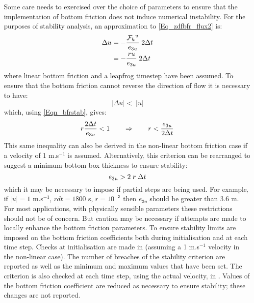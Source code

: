 \documentclass[NEMO_book]{subfiles}
\begin{document}
Some care needs to exercised over the choice of parameters to ensure that the
implementation of bottom friction does not induce numerical instability. For 
the purposes of stability analysis, an approximation to \eqref{Eq_zdfbfr_flux2}
is:
\begin{equation} \label{Eqn_bfrstab}
\begin{split}
 \Delta u &= -\frac{{{\cal F}_h}^u}{e_{3u}}\;2 \Delta t    \\
               &= -\frac{ru}{e_{3u}}\;2\Delta t\\
\end{split}
\end{equation}
\noindent where linear bottom friction and a leapfrog timestep have been assumed. 
To ensure that the bottom friction cannot reverse the direction of flow it is necessary to have:
\begin{equation}
 |\Delta u| < \;|u| 
\end{equation}
\noindent which, using \eqref{Eqn_bfrstab}, gives:
\begin{equation}
r\frac{2\Delta t}{e_{3u}} < 1 \qquad  \Rightarrow \qquad r < \frac{e_{3u}}{2\Delta t}\\
\end{equation}
This same inequality can also be derived in the non-linear bottom friction case 
if a velocity of 1 m.s$^{-1}$ is assumed. Alternatively, this criterion can be 
rearranged to suggest a minimum bottom box thickness to ensure stability:
\begin{equation}
e_{3u} > 2\;r\;\Delta t
\end{equation}
\noindent which it may be necessary to impose if partial steps are being used. 
For example, if $|u| = 1$ m.s$^{-1}$, $rdt = 1800$ s, $r = 10^{-3}$ then
$e_{3u}$ should be greater than 3.6 m. For most applications, with physically
sensible parameters these restrictions should not be of concern. But 
caution may be necessary if attempts are made to locally enhance the bottom
friction parameters. 
To ensure stability limits are imposed on the bottom friction coefficients both during 
initialisation and at each time step. Checks at initialisation are made in  
(assuming a 1 m.s$^{-1}$ velocity in the non-linear case).
The number of breaches of the stability criterion are reported as well as the minimum 
and maximum values that have been set. The criterion is also checked at each time step, 
using the actual velocity, in . Values of the bottom friction coefficient are 
reduced as necessary to ensure stability; these changes are not reported.
\end{document}
